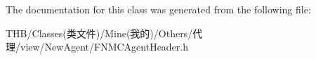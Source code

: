 The documentation for this class was generated from the following file\+:\begin{DoxyCompactItemize}
\item 
T\+H\+B/\+Classes(类文件)/\+Mine(我的)/\+Others/代理/view/\+New\+Agent/F\+N\+M\+C\+Agent\+Header.\+h\end{DoxyCompactItemize}
